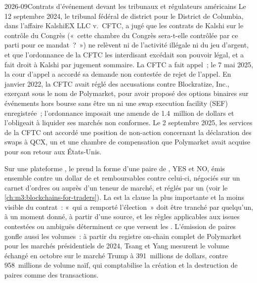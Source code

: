 \begin{dated}{2026-09}{Contrats d'événement devant les tribunaux et régulateurs américains}\label{dat:m3:prediction-and-betting-markets:kalshi}
Le 12 septembre 2024, le tribunal fédéral de district pour le District de Columbia, dans l'affaire KalshiEX LLC v.\ CFTC, a jugé que les contrats de Kalshi sur le contrôle du Congrès
(«~cette chambre du Congrès sera-t-elle contrôlée par ce parti pour ce mandat~?~») ne relèvent ni de l'activité illégale ni du jeu d'argent, et que l'ordonnance de la CFTC les interdisant
excédait son pouvoir légal, et a fait droit à Kalshi par jugement sommaire. La CFTC a fait appel~; le 7 mai 2025, la cour d'appel a accordé
sa demande non contestée de rejet de l'appel. En janvier 2022, la CFTC avait réglé des accusations contre Blockratize, Inc., exerçant sous le nom de Polymarket, pour
avoir proposé des options binaires sur événements hors bourse sans être un  ni une swap execution facility (SEF) enregistrée~; l'ordonnance imposait
une amende de 1.4~million de dollars et l'obligeait à liquider ses marchés non conformes. Le 2 septembre 2025, les services de la CFTC ont accordé une position de non-action
concernant la déclaration des swaps à QCX, un  et une chambre de compensation que Polymarket avait acquise pour son retour aux États-Unis.
\end{dated}

Sur une plateforme , le  prend la forme d'une paire de , YES et NO, émis ensemble contre un dollar de  et remboursables contre celui-ci,
négociés sur un carnet d'ordres ou auprès d'un teneur de marché, et réglés par un  (voir le \cref{ch:m3:blockchains-for-traders}). La  est la
clause la plus importante et la moins visible du contrat~: «~qui a remporté l'élection~» doit être tranché par quelqu'un, à un moment donné, à partir d'une source, et les règles applicables aux issues contestées
ou ambiguës déterminent ce que versent les . L'émission de paires gonfle aussi les volumes~: à partir du registre on-chain complet de Polymarket pour les
marchés présidentiels de 2024, Tsang et Yang mesurent le volume échangé en octobre sur le marché Trump à 391~millions de dollars, contre 958~millions de volume naïf, qui comptabilise
la création et la destruction de paires comme des transactions.


